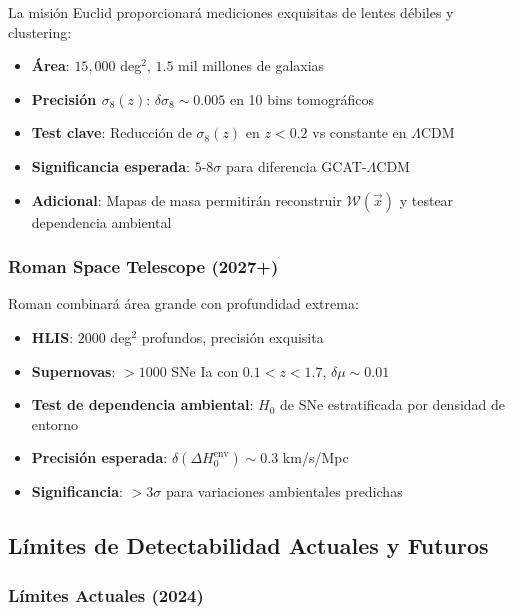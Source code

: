 \documentclass[12pt, a4paper]{article}
\theoremstyle{plain}
\theoremstyle{definition}
\begin{document}
La misión Euclid proporcionará mediciones exquisitas de lentes débiles y clustering:

\begin{itemize}
    \item \textbf{Área}: $15,000$ deg$^2$, $1.5$ mil millones de galaxias
    \item \textbf{Precisión $\sigma_8(z)$}: $\delta\sigma_8 \sim 0.005$ en 10 bins tomográficos
    \item \textbf{Test clave}: Reducción de $\sigma_8(z)$ en $z < 0.2$ vs constante en $\Lambda$CDM
    \item \textbf{Significancia esperada}: $5$-$8\sigma$ para diferencia GCAT-$\Lambda$CDM
    \item \textbf{Adicional}: Mapas de masa permitirán reconstruir $\mathcal{W}(\vec{x})$ y testear dependencia ambiental
\end{itemize}

\subsubsection{Roman Space Telescope (2027+)}

Roman combinará área grande con profundidad extrema:

\begin{itemize}
    \item \textbf{HLIS}: $2000$ deg$^2$ profundos, precisión exquisita
    \item \textbf{Supernovas}: $> 1000$ SNe Ia con $0.1 < z < 1.7$, $\delta\mu \sim 0.01$
    \item \textbf{Test de dependencia ambiental}: $H_0$ de SNe estratificada por densidad de entorno
    \item \textbf{Precisión esperada}: $\delta(\Delta H_0^{\mathrm{env}}) \sim 0.3$ km/s/Mpc
    \item \textbf{Significancia}: $> 3\sigma$ para variaciones ambientales predichas
\end{itemize}

\subsection{Límites de Detectabilidad Actuales y Futuros}

\subsubsection{Límites Actuales (2024)}
\end{document}
